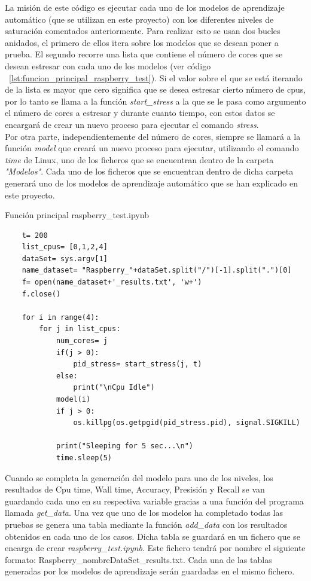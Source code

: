 \documentclass[a4paper, 12pt]{book}
\begin{document}
La misión de este código es ejecutar cada uno de los modelos de aprendizaje automático (que se utilizan en este proyecto) con los diferentes niveles de saturación comentados anteriormente. Para realizar esto se usan dos bucles anidados, el primero de ellos itera sobre los modelos que se desean poner a prueba. El segundo recorre una lista que contiene el número de cores que se desean estresar con cada uno de los modelos (ver código ~\ref{lst:funcion_principal_raspberry_test}). Si el valor sobre el que se está iterando de la lista es mayor que cero significa que se desea estresar cierto número de cpus, por lo tanto se llama a la función \textit{start\_stress} a la que se le pasa como argumento el número de cores a estresar y durante cuanto tiempo, con estos datos se encargará de crear un nuevo proceso para ejecutar el comando \textit{stress}.\\
Por otra parte, independientemente del número de cores, siempre se llamará a la función \textit{model} que creará un nuevo proceso para ejecutar, utilizando el comando \textit{time} de Linux, uno de los ficheros que se encuentran dentro de la carpeta \textit{"Modelos"}. Cada uno de los ficheros que se encuentran dentro de dicha carpeta generará uno de los modelos de aprendizaje automático que se han explicado en este proyecto. 

\begin{listing}[h!]
    \caption{Función principal raspberry\_test.ipynb}{}
    \label{lst:funcion_principal_raspberry_test}
    \begin{verbatim}
    t= 200
    list_cpus= [0,1,2,4]
    dataSet= sys.argv[1]
    name_dataset= "Raspberry_"+dataSet.split("/")[-1].split(".")[0]
    f= open(name_dataset+'_results.txt', 'w+')
    f.close()
    
    for i in range(4):
        for j in list_cpus:
            num_cores= j
            if(j > 0):
                pid_stress= start_stress(j, t)
            else:
                print("\nCpu Idle")
            model(i)
            if j > 0:
                os.killpg(os.getpgid(pid_stress.pid), signal.SIGKILL)
            
            print("Sleeping for 5 sec...\n")
            time.sleep(5)
    \end{verbatim}
\end{listing}

Cuando se completa la generación del modelo para uno de los niveles, los resultados de Cpu time, Wall time, Accuracy, Presisión y Recall se van guardando cada uno en su respectiva variable gracias a una función del programa llamada \textit{get\_data}. Una vez que uno de los modelos ha completado todas las pruebas se genera una tabla mediante la función \textit{add\_data} con los resultados obtenidos en cada uno de los casos.
Dicha tabla se guardará en un fichero que se encarga de crear \textit{raspberry\_test.ipynb}. Este fichero tendrá por nombre el siguiente formato: Raspberry\_nombreDataSet\_results.txt.
Cada una de las tablas generadas por los modelos de aprendizaje serán guardadas en el mismo fichero.
\end{document}
